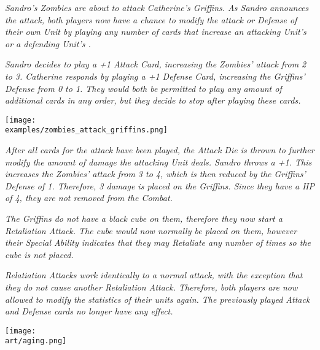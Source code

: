 \begin{multicols*}{2}
\textit{Sandro's Zombies are about to attack Catherine's Griffins.
As Sandro announces the attack, both players now have a chance to modify the attack or Defense of their own Unit by playing any number of  cards that increase an attacking Unit's  or a defending Unit's .}\par
\textit{Sandro decides to play a +1 Attack Card, increasing the Zombies' attack from 2 to 3.
Catherine responds by playing a +1 Defense Card, increasing the Griffins' Defense from 0 to 1.
They would both be permitted to play any amount of additional cards in any order, but they decide to stop after playing these cards.}\par

\texttt{[image: \\examples/zombies\_attack\_griffins.png]}

\textit{After all cards for the attack have been played, the Attack Die is thrown to further modify the amount of damage the attacking Unit deals.
Sandro throws a +1.
This increases the Zombies' attack from 3 to 4, which is then reduced by the Griffins' Defense of 1. Therefore, 3 damage  is placed on the Griffins. Since they have a HP  of 4, they are not removed from the Combat.}\par
\textit{The Griffins do not have a black cube on them, therefore they now start a Retaliation Attack.
The cube would now normally be placed on them, however their Special  Ability indicates that they may Retaliate any number of times so the cube is not placed.}\par
\textit{Relatiation Attacks work identically to a normal attack, with the exception that they do not cause another Retaliation Attack.
Therefore, both players are now allowed to modify the statistics of their units again.
The previously played Attack and Defense cards no longer have any effect.}

\vfill

\hspace{-2em}
\texttt{[image: \\art/aging.png]}


\end{multicols*}

